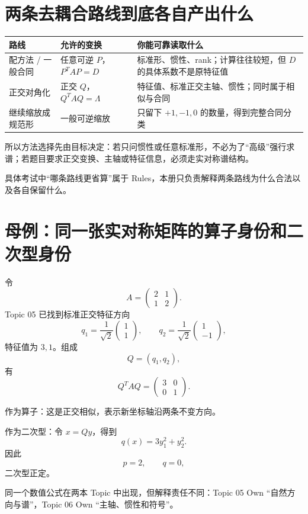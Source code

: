 \documentclass[11pt,a4paper]{ctexart}
\begin{document}
\section{两条去耦合路线到底各自产出什么}

\begin{longtable}{L{3.0cm}L{4.3cm}L{\dimexpr\linewidth-7.8cm\relax}}
\toprule
\textbf{路线} & \textbf{允许的变换} & \textbf{你能可靠读取什么}\\
\midrule
配方法 / 一般合同 & 任意可逆 $P$，$P^TAP=D$ & 标准形、惯性、rank；计算往往较短，但 $D$ 的具体系数不是原特征值\\
正交对角化 & 正交 $Q$，$Q^TAQ=\Lambda$ & 特征值、标准正交主轴、惯性；同时属于相似与合同\\
继续缩放成规范形 & 一般可逆缩放 & 只留下 $+1,-1,0$ 的数量，得到完整合同分类\\
\bottomrule
\end{longtable}

所以方法选择先由目标决定：若只问惯性或任意标准形，不必为了“高级”强行求谱；若题目要求正交变换、主轴或特征信息，必须走实对称谱结构。

具体考试中“哪条路线更省算”属于 Rules，本册只负责解释两条路线为什么合法以及各自保留什么。

\section{母例：同一张实对称矩阵的算子身份和二次型身份}

令
\[
A=\begin{pmatrix}2&1\\1&2\end{pmatrix}.
\]
Topic 05 已找到标准正交特征方向
\[
q_1=\frac1{\sqrt2}\begin{pmatrix}1\\1\end{pmatrix},
\qquad
q_2=\frac1{\sqrt2}\begin{pmatrix}1\\-1\end{pmatrix},
\]
特征值为 $3,1$。组成
\[
Q=(q_1,q_2),
\]
有
\[
Q^TAQ=\begin{pmatrix}3&0\\0&1\end{pmatrix}.
\]

作为算子：这是正交相似，表示新坐标轴沿两条不变方向。

作为二次型：令 $x=Qy$，得到
\[
q(x)=3y_1^2+y_2^2.
\]
因此
\[
p=2,\qquad q=0,
\]
二次型正定。

同一个数值公式在两本 Topic 中出现，但解释责任不同：Topic 05 Own “自然方向与谱”，Topic 06 Own “主轴、惯性和符号”。
\end{document}
